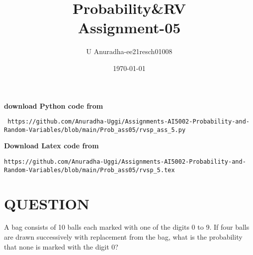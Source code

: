 \documentclass[journal,12pt,twocolumn]{IEEEtran}
\title{Probability\&RV \\ Assignment-05}
\author{U Anuradha-ee21resch01008}
\date{\today}
\begin{document}
\maketitle
\newpage
\bigskip
\renewcommand{\thefigure}{\theenumi}
\renewcommand{\thetable}{\theenumi}
\textbf{download Python code from}
\begin{lstlisting}
 https://github.com/Anuradha-Uggi/Assignments-AI5002-Probability-and-Random-Variables/blob/main/Prob_ass05/rvsp_ass_5.py
\end{lstlisting}
\textbf{Download Latex code from}
\begin{lstlisting}
https://github.com/Anuradha-Uggi/Assignments-AI5002-Probability-and-Random-Variables/blob/main/Prob_ass05/rvsp_5.tex
\end{lstlisting}
\section{\textbf{QUESTION}}
A bag consists of 10 balls each marked with one of the digits 0 to 9. If four balls are drawn successively with replacement from the bag,
what is the probability that none is marked with the digit 0?
\end{document}
